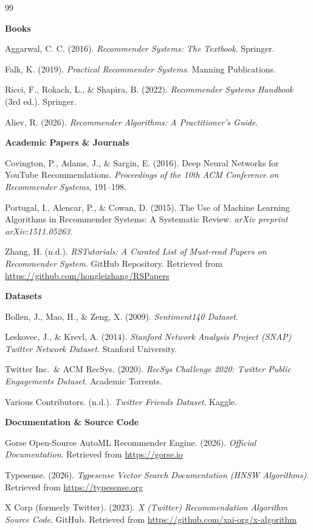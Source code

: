 \begin{thebibliography}{99}

\item[] \textbf{\large Books}

Aggarwal, C. C. (2016). \textit{Recommender Systems: The Textbook}. Springer.

Falk, K. (2019). \textit{Practical Recommender Systems}. Manning Publications.

Ricci, F., Rokach, L., \& Shapira, B. (2022). \textit{Recommender Systems Handbook} (3rd ed.). Springer.

Aliev, R. (2026). \textit{Recommender Algorithms: A Practitioner's Guide}.

\item[] \textbf{\large Academic Papers \& Journals}

Covington, P., Adams, J., \& Sargin, E. (2016). Deep Neural Networks for YouTube Recommendations. \textit{Proceedings of the 10th ACM Conference on Recommender Systems}, 191--198.

Portugal, I., Alencar, P., \& Cowan, D. (2015). The Use of Machine Learning Algorithms in Recommender Systems: A Systematic Review. \textit{arXiv preprint arXiv:1511.05263}.

Zhang, H. (n.d.). \textit{RSTutorials: A Curated List of Must-read Papers on Recommender System}. GitHub Repository. Retrieved from \url{https://github.com/hongleizhang/RSPapers}

\item[] \textbf{\large Datasets}

Bollen, J., Mao, H., \& Zeng, X. (2009). \textit{Sentiment140 Dataset}.

Leskovec, J., \& Krevl, A. (2014). \textit{Stanford Network Analysis Project (SNAP) Twitter Network Dataset}. Stanford University.

Twitter Inc.\ \& ACM RecSys. (2020). \textit{RecSys Challenge 2020: Twitter Public Engagements Dataset}. Academic Torrents.

Various Contributors. (n.d.). \textit{Twitter Friends Dataset}. Kaggle.

\item[] \textbf{\large Documentation \& Source Code}

Gorse Open-Source AutoML Recommender Engine. (2026). \textit{Official Documentation}. Retrieved from \url{https://gorse.io}

Typesense. (2026). \textit{Typesense Vector Search Documentation (HNSW Algorithms)}. Retrieved from \url{https://typesense.org}

X Corp (formerly Twitter). (2023). \textit{X (Twitter) Recommendation Algorithm Source Code}. GitHub. Retrieved from \url{https://github.com/xai-org/x-algorithm}

\end{thebibliography}
